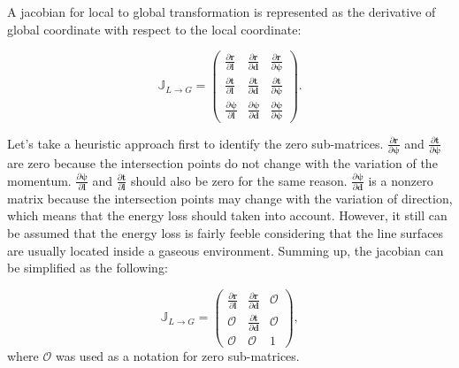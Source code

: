 \documentclass[12pt,a4paper]{scrarticle}
\begin{document}
A jacobian for local to global transformation is represented as the derivative of global coordinate with respect to the local coordinate:

\begin{equation}\label{eq:jacobi}
    \mathbb{J}_{L \rightarrow G} = 
    \begin{pmatrix}
     \frac{\partial{\mathbf{r}}}{\partial{\mathbf{l}}} & \frac{\partial{\mathbf{r}}}{\partial{\mathbf{d}}} & \frac{\partial{\mathbf{r}}}{\partial{\mathbf{\psi}}} \\
     \frac{\partial{\mathbf{t}}}{\partial{\mathbf{l}}} & \frac{\partial{\mathbf{t}}}{\partial{\mathbf{d}}} & \frac{\partial{\mathbf{t}}}{\partial{\mathbf{\psi}}} \\
    \frac{\partial{\mathbf{\psi}}}{\partial{\mathbf{l}}} & \frac{\partial{\mathbf{\psi}}}{\partial{\mathbf{d}}} & \frac{\partial{\mathbf{\psi}}}{\partial{\mathbf{\psi}}}
    \end{pmatrix}.
\end{equation}

Let's take a heuristic approach first to identify the zero sub-matrices. $\frac{\partial{\mathbf{r}}}{\partial{\mathbf{\psi}}}$ and $\frac{\partial{\mathbf{t}}}{\partial{\mathbf{\psi}}}$ are zero because the intersection points do not change with the variation of the momentum. $\frac{\partial{\mathbf{\psi}}}{\partial{\mathbf{l}}}$ and $\frac{\partial{\mathbf{t}}}{\partial{\mathbf{l}}}$ should also be zero for the same reason.  $\frac{\partial{\mathbf{\psi}}}{\partial{\mathbf{d}}}$ is a nonzero matrix because the intersection points may change with the variation of direction, which means that the energy loss should taken into account. However, it still can be assumed that the energy loss is fairly feeble considering that the line surfaces are usually located inside a gaseous environment. Summing up, the jacobian can be simplified as the following:

\begin{equation}\label{eq:jacobi2}
    \mathbb{J}_{L \rightarrow G} = 
    \begin{pmatrix}
     \frac{\partial{\mathbf{r}}}{\partial{\mathbf{l}}} & \frac{\partial{\mathbf{r}}}{\partial{\mathbf{d}}} &  \mathcal{O} \\
     \mathcal{O} & \frac{\partial{\mathbf{t}}}{\partial{\mathbf{d}}} &  \mathcal{O} \\
     \mathcal{O} & \mathcal{O} & 1
    \end{pmatrix},
\end{equation}
where $\mathcal{O}$ was used as a notation for zero sub-matrices.
\end{document}
